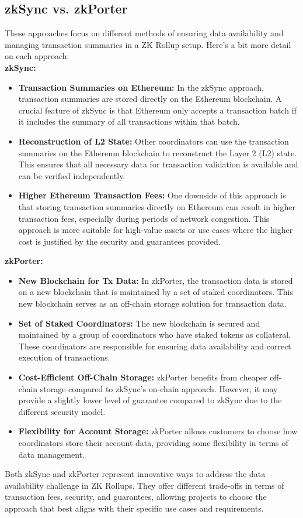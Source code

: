 \documentclass{report}
\begin{document}
\subsection{zkSync vs. zkPorter}
These approaches focus on different methods of ensuring data availability and managing transaction summaries in a ZK Rollup setup. Here's a bit more detail on each approach:\\
\textbf{zkSync:}\\
\begin{itemize}
	\item \textbf{Transaction Summaries on Ethereum:} In the zkSync approach, transaction summaries are stored directly on the Ethereum blockchain. A crucial feature of zkSync is that Ethereum only accepts a transaction batch if it includes the summary of all transactions within that batch.
	\item \textbf{Reconstruction of L2 State:} Other coordinators can use the transaction summaries on the Ethereum blockchain to reconstruct the Layer 2 (L2) state. This ensures that all necessary data for transaction validation is available and can be verified independently.
	\item \textbf{Higher Ethereum Transaction Fees:} One downside of this approach is that storing transaction summaries directly on Ethereum can result in higher transaction fees, especially during periods of network congestion. This approach is more suitable for high-value assets or use cases where the higher cost is justified by the security and guarantees provided.
\end{itemize}
\textbf{zkPorter:}
\begin{itemize}
	\item \textbf{New Blockchain for Tx Data:} In zkPorter, the transaction data is stored on a new blockchain that is maintained by a set of staked coordinators. This new blockchain serves as an off-chain storage solution for transaction data.
	\item \textbf{Set of Staked Coordinators:} The new blockchain is secured and maintained by a group of coordinators who have staked tokens as collateral. These coordinators are responsible for ensuring data availability and correct execution of transactions.
	\item \textbf{Cost-Efficient Off-Chain Storage:} zkPorter benefits from cheaper off-chain storage compared to zkSync's on-chain approach. However, it may provide a slightly lower level of guarantee compared to zkSync due to the different security model.
	\item \textbf{Flexibility for Account Storage:} zkPorter allows customers to choose how coordinators store their account data, providing some flexibility in terms of data management.
\end{itemize}
Both zkSync and zkPorter represent innovative ways to address the data availability challenge in ZK Rollups. They offer different trade-offs in terms of transaction fees, security, and guarantees, allowing projects to choose the approach that best aligns with their specific use cases and requirements.
\end{document}

